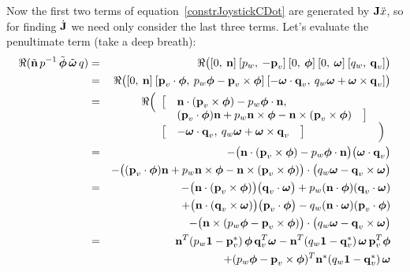Now the first two terms of equation~\ref{constrJoystickCDot} are generated by $\m{J}\ddot{x}$, so
for finding $\dot{\m{J}}$ we need only consider the last three terms. Let's evaluate the
penultimate term (take a deep breath):
\begin{eqnarray*}
\Re(\tilde{\ve{n}}\, \q{p}^{-1}\, \tilde{\ve{\phi}}\,\tilde{\ve{\omega}}\, \q{q}) & = &
    \Re\big( [0,\:\ve{n}]\: [p_w,\:-\ve{p}_v]\: [0,\:\ve{\phi}]\: [0,\:\ve{\omega}]\:
    [q_w,\:\ve{q}_v] \big) \\*
&=& \Re\big( [0,\:\ve{n}]\: [\ve{p}_v \cdot \ve{\phi},\: p_w\ve{\phi} - \ve{p}_v\times\ve{\phi}]\:
    [-\ve{\omega}\cdot\ve{q}_v,\: q_w\ve{\omega} + \ve{\omega}\times\ve{q}_v] \big) \\*
&=& \Re\Big( \begin{array}[t]{lll} \big[ &
    \ve{n}\cdot(\ve{p}_v\times\ve{\phi}) - p_w \ve{\phi}\cdot\ve{n}, &\\ &
    (\ve{p}_v\cdot\ve{\phi}) \ve{n} + p_w\ve{n}\times\ve{\phi} -
        \ve{n}\times(\ve{p}_v\times\ve{\phi}) \quad\big] &\\
    \big[ & -\ve{\omega}\cdot\ve{q}_v,\: q_w\ve{\omega} +
        \ve{\omega}\times\ve{q}_v \quad\big] & \Big) \end{array} \\
&=& -\big( \ve{n}\cdot(\ve{p}_v\times\ve{\phi}) - p_w \ve{\phi}\cdot\ve{n} \big)
     \big( \ve{\omega}\cdot\ve{q}_v \big) \\* &&
    -\big( (\ve{p}_v\cdot\ve{\phi}) \ve{n} + p_w\ve{n}\times\ve{\phi} -
        \ve{n}\times(\ve{p}_v\times\ve{\phi}) \big) \cdot
     \big( q_w\ve{\omega} - \ve{q}_v\times\ve{\omega} \big) \\
&=& -\big( \ve{n}\cdot(\ve{p}_v\times\ve{\phi}) \big) \big( \ve{q}_v\cdot\ve{\omega} \big)
    + p_w (\ve{n}\cdot\ve{\phi}) (\ve{q}_v\cdot\ve{\omega}) \\* &&
    +\big( \ve{n}\cdot(\ve{q}_v\times\ve{\omega}) \big) \big( \ve{p}_v\cdot\ve{\phi} \big)
    - q_w (\ve{n}\cdot\ve{\omega}) (\ve{p}_v\cdot\ve{\phi}) \\* &&
    -\big( \ve{n}\times(p_w\ve{\phi} - \ve{p}_v\times\ve{\phi}) \big) \cdot
     \big( q_w\ve{\omega} - \ve{q}_v\times\ve{\omega} \big) \\
&=&  \ve{n}^T (p_w\m{1} - \dual{\ve{p}_v})\, \ve{\phi}\,\ve{q}_v^T \ve{\omega}
    -\ve{n}^T (q_w\m{1} - \dual{\ve{q}_v})\, \ve{\omega}\,\ve{p}_v^T \ve{\phi} \\* &&
    +(p_w\ve{\phi} - \ve{p}_v\times\ve{\phi})^T \dual{\ve{n}}
    (q_w\m{1} - \dual{\ve{q}_v})\, \ve{\omega}
\end{eqnarray*}

